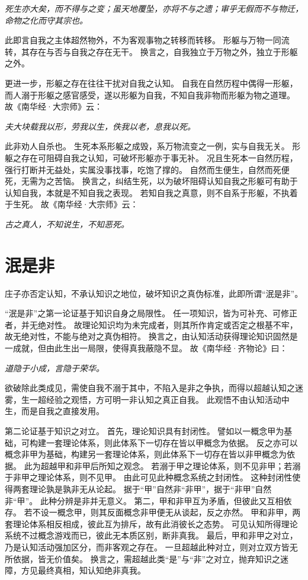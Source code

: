 \documentclass[11pt]{article}
\begin{document}
\textit{死生亦大矣，而不得与之变；虽天地覆坠，亦将不与之遗；审乎无假而不与物迁，命物之化而守其宗也。}

此即言自我之主体超然物外，不为客观事物之转移而转移。
形躯与万物一同流转，其存在与否与自我之存在无干。
换言之，自我独立于万物之外，独立于形躯之外。

\par

更进一步，形躯之存在往往干扰对自我之认知。
自我在自然历程中偶得一形躯，而人溺于形躯之感官感受，遂以形躯为自我，不知自我非物而形躯为物之道理。
故《南华经·大宗师》云：

\textit{夫大块载我以形，劳我以生，佚我以老，息我以死。}

此非劝人自杀也。
生死本系形躯之成毁，系万物流变之一例，实与自我无关。
形躯之存在可阻碍自我之认知，可破坏形躯亦于事无补。
况且生死本一自然历程，强行打断并无益处，实属没事找事，吃饱了撑的。
自然而生便生，自然而死便死，无需为之苦恼。
换言之，纠结生死，以为破坏阻碍认知自我之形躯可有助于认知自我，本就是不知自我之表现。
若知自我之真意，则不自系于形躯，不执着于生死。
故《南华经·大宗师》云：

\textit{古之真人，不知说生，不知恶死。}

\section{泯是非}
庄子亦否定认知，不承认知识之地位，破坏知识之真伪标准，此即所谓“泯是非”。

\par

“泯是非”之第一论证基于知识自身之局限性。
任一项知识，皆为可补充、可修正者，并无绝对性。
故理论知识均为未完成者，则其所作肯定或否定之根基不牢，故无绝对性，不能与绝对之真伪相符。
换言之，由认知活动获得理论知识固然是一成就，但由此生出一局限，使得真我蔽隐不显。
故《南华经·齐物论》曰：

\textit{道隐于小成，言隐于荣华。}

欲破除此类成见，需使自我不溺于其中，不陷入是非之争执，而得以超越认知之迷雾，生一超经验之观悟，方可明一非认知之真正自我。
此观悟不由认知活动中生，而是自我之直接发用。

\par

第二论证基于知识之对立。
首先，理论知识具有封闭性。
譬如以一概念甲为基础，可构建一套理论体系，则此体系下一切存在皆以甲概念为依据。
反之亦可以概念非甲为基础，构建另一套理论体系，则此体系下一切存在皆以非甲概念为依据。
此为超越甲和非甲后所知之观念。
若溺于甲之理论体系，则不见非甲；若溺于非甲之理论体系，则不见甲。
由此可见此种概念系统之封闭性。
这种封闭性使得两套理论孰是孰非无从论起。
据于“甲”自然非“非甲”，据于“非甲”自然非“甲”。
此种分辨是非并无意义。
第二，甲和非甲互为矛盾，但彼此又互相依存。
若不设一概念甲，则其反面概念非甲便无从谈起，反之亦然。
甲和非甲，两套理论体系相反相成，彼此互为排斥，故有此消彼长之态势。
可见认知所得理论系统不过概念游戏而已，彼此无本质区别，断非真我。
最后，甲和非甲之对立，乃是认知活动强加区分，而非客观之存在。
一旦超越此种对立，则对立双方皆无所依据，皆无价值矣。
换言之，需超越此类“是”与“非”之对立，抛弃知识之迷障，方见最终真相，知认知绝非真我。
\end{document}
